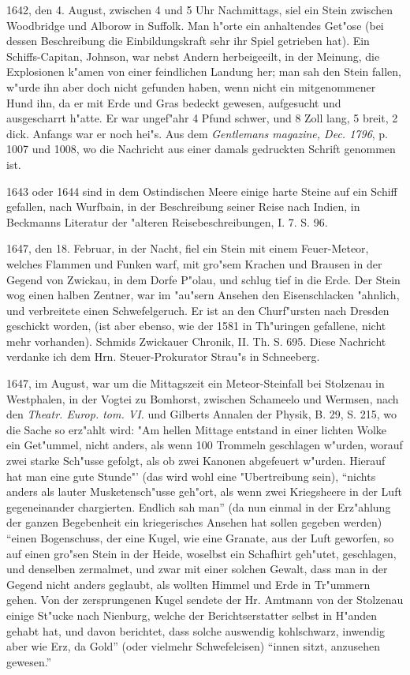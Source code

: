 \documentclass[a4paper, 11pt, oneside, polutonikogreek, german]{article}
\begin{document}
1642, den 4. August, zwischen 4 und 5 Uhr Nachmittags, siel ein Stein zwischen Woodbridge und Alborow in Suffolk. Man h"orte ein anhaltendes Get"ose (bei dessen Beschreibung die Einbildungskraft sehr ihr Spiel getrieben hat). Ein Schiffs-Capitan, Johnson, war nebst Andern herbeigeeilt, in der Meinung, die Explosionen k"amen von einer feindlichen Landung her; man sah den Stein fallen, w"urde ihn aber doch nicht gefunden haben, wenn nicht ein mitgenommener Hund ihn, da er mit Erde und Gras bedeckt gewesen, aufgesucht und ausgescharrt h"atte. Er war ungef"ahr 4 Pfund schwer, und 8 Zoll lang, 5 breit, 2 dick. Anfangs war er noch hei"s. Aus dem \emph{Gentlemans magazine, Dec. 1796}, p. 1007 und 1008, wo die Nachricht aus einer damals gedruckten Schrift genommen ist.

1643 oder 1644 sind in dem Ostindischen Meere einige harte Steine auf ein Schiff gefallen, nach Wurfbain, in der Beschreibung seiner Reise nach Indien, in Beckmanns Literatur der "alteren Reisebeschreibungen, I. 7. S. 96.

1647, den 18. Februar, in der Nacht, fiel ein Stein mit einem Feuer-Meteor, welches Flammen und Funken warf, mit gro"sem Krachen und Brausen in der Gegend von Zwickau, in dem Dorfe P"olau, und schlug tief in die Erde. Der Stein wog einen halben Zentner, war im "au"sern Ansehen den Eisenschlacken "ahnlich, und verbreitete einen Schwefelgeruch. Er ist an den Churf"ursten nach Dresden geschickt worden, (ist aber ebenso, wie der 1581 in Th"uringen gefallene, nicht mehr vorhanden). Schmids Zwickauer Chronik, II. Th. S. 695. Diese Nachricht verdanke ich dem Hrn. Steuer-Prokurator Strau"s in Schneeberg.

1647, im August, war um die Mittagszeit ein Meteor-Steinfall bei Stolzenau in Westphalen, in der Vogtei zu Bomhorst, zwischen Schameelo und Wermsen, nach den \emph{Theatr. Europ. tom. VI.} und Gilberts Annalen der Physik, B. 29, S. 215, wo die Sache so erz"ahlt wird: "Am hellen Mittage entstand in einer lichten Wolke ein Get"ummel, nicht anders, als wenn 100 Trommeln geschlagen w"urden, worauf zwei starke Sch"usse gefolgt, als ob zwei Kanonen abgefeuert w"urden. Hierauf hat man eine gute Stunde"' (das wird wohl eine "Ubertreibung sein), "`nichts anders als lauter Musketensch"usse geh"ort, als wenn zwei Kriegsheere in der Luft gegeneinander chargierten. Endlich sah man"' (da nun einmal in der Erz"ahlung der ganzen Begebenheit ein kriegerisches Ansehen hat sollen gegeben werden) "`einen Bogenschuss, der eine Kugel, wie eine Granate, aus der Luft geworfen, so auf einen gro"sen Stein in der Heide, woselbst ein Schafhirt geh"utet, geschlagen, und denselben zermalmet, und zwar mit einer solchen Gewalt, dass man in der Gegend nicht anders geglaubt, als wollten Himmel und Erde in Tr"ummern gehen. Von der zersprungenen Kugel sendete der Hr. Amtmann von der Stolzenau einige St"ucke nach Nienburg, welche der Berichtserstatter selbst in H"anden gehabt hat, und davon berichtet, dass solche auswendig kohlschwarz, inwendig aber wie Erz, da Gold"' (oder vielmehr Schwefeleisen) "`innen sitzt, anzusehen gewesen."'
\end{document}
